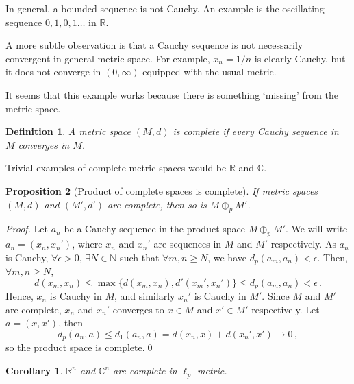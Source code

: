 \documentclass{article}
\theoremstyle{plain}\theoremheaderfont{\normalfont\itshape}\theorembodyfont{\rmfamily}\theoremseparator{.}\newtheorem*{rem}{Remark}\newtheorem*{ex}{Example}\newtheorem*{proof}{Proof}\newtheorem*{altp}{Alternative proof}
\theoremstyle{plain}\theoremheaderfont{\normalfont\bfseries}\theorembodyfont{\rmfamily}\theoremseparator{.}\newtheorem{thm}{Theorem}[section]\newtheorem{lem}[thm]{Lemma}\newtheorem{prop}[thm]{Proposition}\newtheorem*{cor}{Corollary}\newtheorem{defn}[thm]{Definition}\newtheorem{clm}[thm]{Claim}\newtheorem{clminproof}{Claim}
\theoremstyle{break}\theoremheaderfont{\normalfont\itshape}\theorembodyfont{\rmfamily}\theoremseparator{.\medskip}\newtheorem*{proofskip}{Proof}\newtheorem*{exs}{Examples}\newtheorem*{rems}{Remarks}
\theoremstyle{break}\theoremheaderfont{\normalfont\bfseries}\theorembodyfont{\rmfamily}\theoremseparator{.\medskip}\newtheorem{lemskip}[thm]{Lemma}\newtheorem{defnskip}[thm]{Definition}\newtheorem{propskip}[thm]{Proposition}\newtheorem{thmskip}[thm]{Theorem}
\newcommand{\qed}{\hfill\ensuremath{\Box}}
\begin{document}
    In general, a bounded sequence is not Cauchy. An example is the oscillating sequence \(0,1,0,1\dots\) in \(\mathbb{R}\).

    A more subtle observation is that a Cauchy sequence is not necessarily convergent in general metric space. For example, \(x_n=1/n\) is clearly Cauchy, but it does not converge in \((0,\infty)\) equipped with the usual metric.

    It seems that this example works because there is something `missing' from the metric space.

    \begin{defn}
        A metric space \((M,d)\) is \textit{complete} if every Cauchy sequence in \(M\) converges in \(M\).
    \end{defn}

    Trivial examples of complete metric spaces would be \(\mathbb{R}\) and \(\mathbb{C}\).

    \begin{prop}[Product of complete spaces is complete]
        If metric spaces \((M,d)\) and \((M',d')\) are complete, then so is \(M\oplus_p M'\).
    \end{prop}
    \begin{proof}
        Let \(a_n\) be a Cauchy sequence in the product space \(M\oplus_p M'\). We will write \(a_n=(x_n,x_n')\), where \(x_n\) and \(x_n'\) are sequences in \(M\) and \(M'\) respectively. As \(a_n\) is Cauchy, \(\forall\epsilon>0\), \(\exists N\in\mathbb{N}\) such that \(\forall m,n\ge N\), we have \(d_p(a_m,a_n)<\epsilon\). Then, \(\forall m,n\ge N\),
        \[d(x_m,x_n)\le\max\{d(x_m,x_n),d'(x_m',x_n')\}\le d_p(a_m,a_n)<\epsilon\,.\]
        Hence, \(x_n\) is Cauchy in \(M\), and similarly \(x_n'\) is Cauchy in \(M'\). Since \(M\) and \(M'\) are complete, \(x_n\) and \(x_n'\) converges to \(x\in M\) and \(x'\in M'\) respectively. Let \(a=(x,x')\), then
        \[d_p(a_n,a)\le d_1(a_n,a)=d(x_n,x)+d(x_n',x')\to 0\,,\]
        so the product space is complete.\qed
    \end{proof}
    \begin{cor}
        \(\mathbb{R}^n\) and \(\mathbb{C}^n\) are complete in \(\ell_p\)-metric.
    \end{cor}
\end{document}
